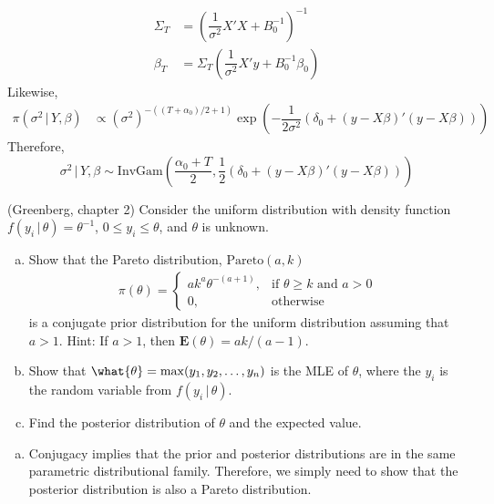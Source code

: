\documentclass[answers]{exam}
\begin{document}
\begin{questions}
\begin{solution}
    \begin{align}
      \Sigma_{T} &= \left(\dfrac{1}{\sigma^{2}}X'X+B_{0}^{-1}\right)^{-1}\\
      \beta_{T} &= \Sigma_{T}\left(\dfrac{1}{\sigma^{2}}X'y+B_{0}^{-1}\beta_{0}\right)
    \end{align}
    Likewise,
    \begin{align}
      \pi\left(\sigma^{2}\,|\,Y,\beta\right) &\propto \left(\sigma^{2}\right)^{-((T+\alpha_{0})/2+1)}\exp\left(-\dfrac{1}{2\sigma^{2}}\left(\delta_{0}+\left(y-X\beta\right)'\left(y-X\beta\right)\right)\right)
    \end{align}
    Therefore,
    \begin{equation}
      \sigma^{2}\,|\,Y,\beta \sim \mathrm{InvGam}\left(\dfrac{\alpha_{0}+T}{2},\dfrac{1}{2}\left(\delta_{0}+\left(y-X\beta\right)'\left(y-X\beta\right)\right)\right)
    \end{equation}
  \end{solution}
  \newpage
  \question
  (Greenberg, chapter 2) Consider the uniform distribution with density function $f(y_{i}\,|\,\theta)=\theta^{-1}$, $0\leq y_{i}\leq \theta$, and $\theta$ is unknown.
  \begin{enumerate}[(a)]
    \item Show that the Pareto distribution, $\mathrm{Pareto}(a,k)$
    \begin{align}
      \pi(\theta) = \begin{cases}ak^{a}\theta^{-(a+1)},&\text{if $\theta\geq k$ and $a>0$}\\ 0, & \text{otherwise}  \end{cases}
    \end{align}
    is a conjugate prior distribution for the uniform distribution assuming that $a>1$. Hint: If $a>1$, then $\mathbf{E}(\theta)=ak/(a-1)$.
    \item Show that $\what{\theta}=\max(y_{1},y_{2},\ldots,y_{n})$ is the MLE of $\theta$, where the $y_{i}$ is the random variable from $f(y_{i}\,|\,\theta)$.
    \item Find the posterior distribution of $\theta$ and the expected value.
  \end{enumerate}
  \begin{solution}
    \begin{enumerate}[(a)]
      \item Conjugacy implies that the prior and posterior distributions are in the same parametric distributional family. Therefore, we simply need to show that the posterior distribution is also a Pareto distribution.

\end{enumerate}
\end{solution}
\end{questions}
\end{document}
